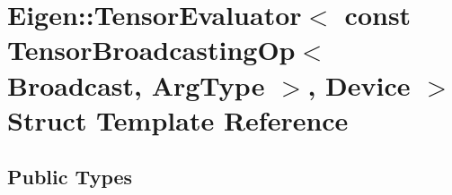 \hypertarget{struct_eigen_1_1_tensor_evaluator_3_01const_01_tensor_broadcasting_op_3_01_broadcast_00_01_arg_type_01_4_00_01_device_01_4}{}\section{Eigen\+:\+:Tensor\+Evaluator$<$ const Tensor\+Broadcasting\+Op$<$ Broadcast, Arg\+Type $>$, Device $>$ Struct Template Reference}
\label{struct_eigen_1_1_tensor_evaluator_3_01const_01_tensor_broadcasting_op_3_01_broadcast_00_01_arg_type_01_4_00_01_device_01_4}
\subsection*{Public Types}
